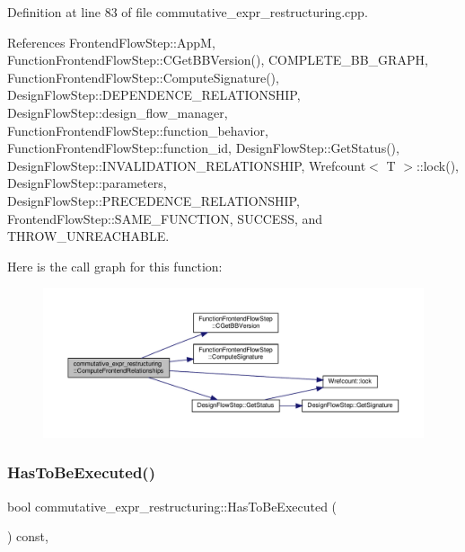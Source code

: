 Definition at line 83 of file commutative\+\_\+expr\+\_\+restructuring.\+cpp.



References Frontend\+Flow\+Step\+::\+AppM, Function\+Frontend\+Flow\+Step\+::\+C\+Get\+B\+B\+Version(), C\+O\+M\+P\+L\+E\+T\+E\+\_\+\+B\+B\+\_\+\+G\+R\+A\+PH, Function\+Frontend\+Flow\+Step\+::\+Compute\+Signature(), Design\+Flow\+Step\+::\+D\+E\+P\+E\+N\+D\+E\+N\+C\+E\+\_\+\+R\+E\+L\+A\+T\+I\+O\+N\+S\+H\+IP, Design\+Flow\+Step\+::design\+\_\+flow\+\_\+manager, Function\+Frontend\+Flow\+Step\+::function\+\_\+behavior, Function\+Frontend\+Flow\+Step\+::function\+\_\+id, Design\+Flow\+Step\+::\+Get\+Status(), Design\+Flow\+Step\+::\+I\+N\+V\+A\+L\+I\+D\+A\+T\+I\+O\+N\+\_\+\+R\+E\+L\+A\+T\+I\+O\+N\+S\+H\+IP, Wrefcount$<$ T $>$\+::lock(), Design\+Flow\+Step\+::parameters, Design\+Flow\+Step\+::\+P\+R\+E\+C\+E\+D\+E\+N\+C\+E\+\_\+\+R\+E\+L\+A\+T\+I\+O\+N\+S\+H\+IP, Frontend\+Flow\+Step\+::\+S\+A\+M\+E\+\_\+\+F\+U\+N\+C\+T\+I\+ON, S\+U\+C\+C\+E\+SS, and T\+H\+R\+O\+W\+\_\+\+U\+N\+R\+E\+A\+C\+H\+A\+B\+LE.

Here is the call graph for this function\+:
\nopagebreak
\begin{figure}[H]
\begin{center}
\leavevmode
\includegraphics[width=350pt]{db/d8c/classcommutative__expr__restructuring_af7722e53fe6fae4fb5aab7bfbb5146e3_cgraph}
\end{center}
\end{figure}
\mbox{\label{classcommutative__expr__restructuring_a9ea0a98a356901b31b212ad25255e784}} 
\subsubsection{\texorpdfstring{Has\+To\+Be\+Executed()}{HasToBeExecuted()}}
{\footnotesize\ttfamily bool commutative\+\_\+expr\+\_\+restructuring\+::\+Has\+To\+Be\+Executed (\begin{DoxyParamCaption}{ }\end{DoxyParamCaption}) const\hspace{0.3cm}{\ttfamily [override]}, {\ttfamily [virtual]}}




